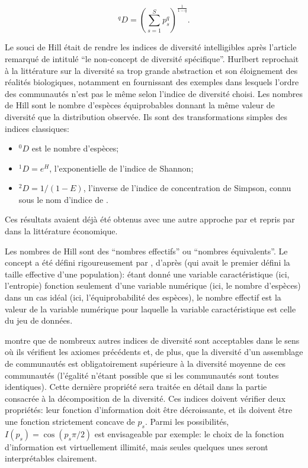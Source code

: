 \documentclass[
  11pt,
  french,
  a4paper,
  extrafontsizes,onecolumn,openright
  ]{memoir}
\providecommand{\tightlist}{%
  \setlength{\itemsep}{0pt}\setlength{\parskip}{0pt}}
\begin{document}
\begin{equation}
  \label{eq:Hill1973}
  ^{q}\!D = {\left(\sum^S_{s=1}{p^q_s}\right)}^{\frac{1}{1-q}}.
\end{equation}

Le souci de Hill était de rendre les indices de diversité intelligibles après l'article remarqué de \textcite{Hurlbert1971} intitulé \enquote{le non-concept de diversité spécifique}.
Hurlbert reprochait à la littérature sur la diversité sa trop grande abstraction et son éloignement des réalités biologiques, notamment en fournissant des exemples dans lesquels l'ordre des communautés n'est pas le même selon l'indice de diversité choisi.
Les nombres de Hill sont le nombre d'espèces équiprobables donnant la même valeur de diversité que la distribution observée.
Ils sont des transformations simples des indices classiques:

\begin{itemize}
\tightlist
\item
  \(^{0}\!D\) est le nombre d'espèces;
\item
  \(^{1}\!D=e^H\), l'exponentielle de l'indice de Shannon;
\item
  \(^{2}\!D={1}/{\left(1-E\right)}\), l'inverse de l'indice de concentration de Simpson, connu sous le nom d'indice de \textcite{Stoddart1983}.
\end{itemize}

Ces résultats avaient déjà été obtenus avec une autre approche par \textcite{MacArthur1965} et repris par \textcite{Adelman1969} dans la littérature économique.

Les nombres de Hill sont des \enquote{nombres effectifs} ou \enquote{nombres équivalents}.
Le concept a été défini rigoureusement par \textcite{Gregorius1991}, d'après \textcite{Wright1931} (qui avait le premier défini la taille effective d'une population): étant donné une variable caractéristique (ici, l'entropie) fonction seulement d'une variable numérique (ici, le nombre d'espèces) dans un cas idéal (ici, l'équiprobabilité des espèces), le nombre effectif est la valeur de la variable numérique pour laquelle la variable caractéristique est celle du jeu de données.

\textcite{Gregorius2014} montre que de nombreux autres indices de diversité sont acceptables dans le sens où ils vérifient les axiomes précédents et, de plus, que la diversité d'un assemblage de communautés est obligatoirement supérieure à la diversité moyenne de ces communautés (l'égalité n'étant possible que si les communautés sont toutes identiques).
Cette dernière propriété sera traitée en détail dans la partie consacrée à la décomposition de la diversité.
Ces indices doivent vérifier deux propriétés: leur fonction d'information doit être décroissante, et ils doivent être une fonction strictement concave de \(p_s\).
Parmi les possibilités, \(I(p_s) = \cos{(p_s {\pi}/{2})}\) est envisageable par exemple: le choix de la fonction d'information est virtuellement illimité, mais seules quelques unes seront interprétables clairement.
\end{document}
